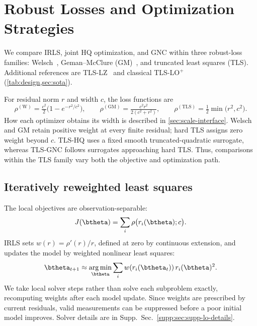 \documentclass[runningheads]{llncs}
\newcommand{\suppsec}[1]{Supp.\ Sec.~\ref{supp:#1}}
\DeclareMathOperator*{\argmin}{arg\,min}
\begin{document}
\section{Robust Losses and Optimization Strategies}
\label{sec:soft-optimization}

We compare IRLS, joint HQ optimization, and GNC within three
robust-loss families: Welsch~\cite{DennisWelsch1978},
Geman--McClure (GM)~\cite{GemanMcClure1985,GemanMcClure1987},
and truncated least squares (TLS). Additional references are
TLS-LZ~\cite{LeZach2021} and classical
TLS-LO$^+$~\cite{Lebeda2012,Sattler2019Github}
(\cref{tab:design,sec:sota}).

For residual norm $r$ and width $c$, the loss functions are
\begin{equation}
	\rho^{(\mathrm W)}=\tfrac{c^2}{2}\bigl(1-e^{-r^2/c^2}\bigr),\qquad
	\rho^{(\mathrm{GM})}=\tfrac{c^2r^2}{2(c^2+r^2)},\qquad
	\rho^{(\mathrm{TLS})}=\tfrac12\min\bigl(r^2,c^2\bigr).
	\label{eq:kernels}
\end{equation}
How each optimizer obtains its width is described in
\cref{sec:scale-interface}.
Welsch and GM retain positive weight at every finite residual;
hard TLS assigns zero weight beyond $c$.
TLS-HQ uses a fixed smooth truncated-quadratic surrogate, whereas
TLS-GNC follows surrogates approaching hard TLS. Thus, comparisons
within the TLS family vary both the objective and optimization path.

\subsection{Iteratively reweighted least squares}

The local objectives are observation-separable:
\begin{equation}
	J(\btheta)=\sum_i \rho\bigl(r_i(\btheta);c\bigr).
	\label{eq:separable}
\end{equation}
IRLS sets $w(r)=\rho'(r)/r$, defined at zero by continuous
extension, and updates the model by weighted nonlinear least squares:
\begin{equation}
	\btheta_{t+1}
	\approx\argmin_{\btheta}
	\sum_i w\!\left(r_i(\btheta_t)\right)r_i(\btheta)^2.
	\label{eq:irls-update}
\end{equation}
We take local solver steps rather than solve each subproblem exactly,
recomputing weights after each model update. Since weights are
prescribed by current residuals, valid measurements can be suppressed
before a poor initial model improves. Solver details are in
\suppsec{sec:supp-lo-details}.
\end{document}
